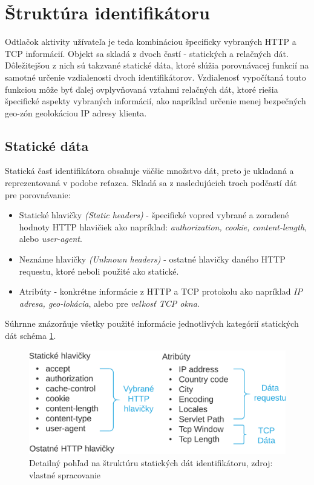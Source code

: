 \documentclass[
  digital, %
  table,   %
  lof,     %
  nolot,   %
  nocover
]{fithesis3}
\begin{document}
\section{Štruktúra identifikátoru}
\label{s:footprint-structure}
Odtlačok aktivity užívateľa je teda kombináciou špecificky vybraných HTTP a TCP informácií.
Objekt sa skladá z dvoch častí - statických a relačných dát. Dôležitejšou z
nich sú takzvané statické dáta, ktoré slúžia porovnávacej funkcií na samotné
určenie vzdialenosti dvoch identifikátorov. Vzdialenosť vypočítaná touto
funkciou môže byť ďalej ovplyvňovaná vzťahmi relačných dát, ktoré riešia
špecifické aspekty vybraných informácií, ako napríklad určenie menej bezpečných
geo-zón geolokáciou IP adresy klienta.

\subsection{Statické dáta}
Statická časť identifikátora obsahuje väčšie množstvo dát, preto je
ukladaná a reprezentovaná v podobe reťazca. Skladá sa z nasledujúcich troch podčastí dát pre porovnávanie:
\begin{itemize}
    \item Statické hlavičky \textit{(Static headers)} - špecifické vopred
    vybrané a zoradené hodnoty HTTP hlavičiek ako napríklad: \textit{authorization, cookie, content-length}, alebo
    \textit{user-agent}.
    \item Neznáme hlavičky \textit{(Unknown headers)} - ostatné hlavičky daného
    HTTP requestu, ktoré neboli použité ako statické.
    \item Atribúty - konkrétne informácie z HTTP a TCP protokolu ako napríklad
    \textit{IP adresa, geo-lokácia}, alebo pre \textit{veľkosť TCP okna}.
\end{itemize}

Súhrnne znázorňuje všetky použité informácie jednotlivých kategórií statických dát schéma
\ref{fig:footprint-data-static}.

\begin{figure}[h]
  \centering
    \includegraphics[width=.99\textwidth]{images/footprint-data-static.png}
  \caption{Detailný pohľad na štruktúru statických dát identifikátoru, zdroj:
  vlastné spracovanie}
  \label{fig:footprint-data-static}
\end{figure}
\end{document}
